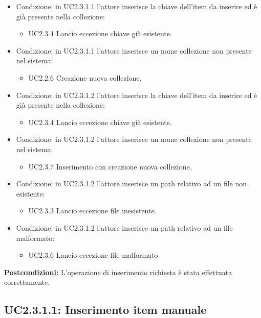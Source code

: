 \documentclass{scalatekids-article}
\begin{document}
\begin{itemize}
\item Condizione: in UC2.3.1.1  l'attore inserisce la chiave dell'item da inserire ed è già presente nella collezione:
  \begin{itemize}
  \item UC2.3.4 Lancio eccezione chiave già esistente.
  \end{itemize}
\item Condizione: in UC2.3.1.1 l'attore inserisce un nome collezione non presente nel sistema:
  \begin{itemize}
  \item UC2.2.6 Creazione nuova collezione. %
  \end{itemize}
\item Condizione: in UC2.3.1.2  l'attore inserisce la chiave dell'item da inserire ed è già presente nella collezione:
  \begin{itemize}
  \item UC2.3.4 Lancio eccezione chiave già esistente.
  \end{itemize}
\item Condizione: in UC2.3.1.2 l'attore inserisce un nome collezione non presente nel sistema:
  \begin{itemize}
  \item UC2.3.7 Inserimento con creazione nuova collezione.
  \end{itemize}
\item Condizione: in UC2.3.1.2 l'attore inserisce un path relativo ad un file non esistente:
  \begin{itemize}
  \item UC2.3.3 Lancio eccezione file inesistente.
  \end{itemize}
\item Condizione: in UC2.3.1.2 l'attore inserisce un path relativo ad un file malformato: %
  \begin{itemize}
  \item UC2.3.6 Lancio eccezione file malformato
  \end{itemize}
\end{itemize}
\textbf{Postcondizioni:} L'operazione di inserimento richiesta è stata effettuata correttamente.

\subsection{UC2.3.1.1: Inserimento item manuale}
\end{document}
